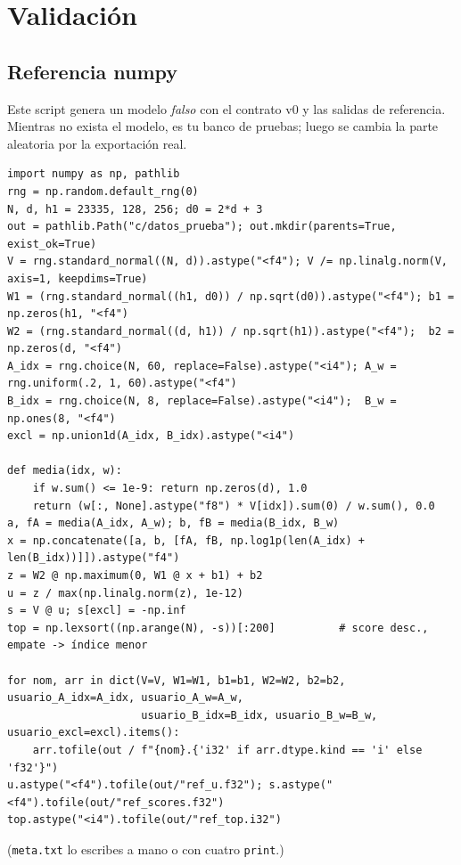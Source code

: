 \documentclass[a4paper,11pt]{article}
\newcommand{\cod}[1]{\texttt{#1}}
\begin{document}
\section{Validación}\label{sec:valid}

\subsection{Referencia numpy}
Este script genera un modelo \emph{falso} con el contrato v0 y las salidas de referencia. Mientras no exista el
modelo, es tu banco de pruebas; luego se cambia la parte aleatoria por la exportación real.
\begin{lstlisting}[style=py]
import numpy as np, pathlib
rng = np.random.default_rng(0)
N, d, h1 = 23335, 128, 256; d0 = 2*d + 3
out = pathlib.Path("c/datos_prueba"); out.mkdir(parents=True, exist_ok=True)
V = rng.standard_normal((N, d)).astype("<f4"); V /= np.linalg.norm(V, axis=1, keepdims=True)
W1 = (rng.standard_normal((h1, d0)) / np.sqrt(d0)).astype("<f4"); b1 = np.zeros(h1, "<f4")
W2 = (rng.standard_normal((d, h1)) / np.sqrt(h1)).astype("<f4");  b2 = np.zeros(d, "<f4")
A_idx = rng.choice(N, 60, replace=False).astype("<i4"); A_w = rng.uniform(.2, 1, 60).astype("<f4")
B_idx = rng.choice(N, 8, replace=False).astype("<i4");  B_w = np.ones(8, "<f4")
excl = np.union1d(A_idx, B_idx).astype("<i4")

def media(idx, w):
    if w.sum() <= 1e-9: return np.zeros(d), 1.0
    return (w[:, None].astype("f8") * V[idx]).sum(0) / w.sum(), 0.0
a, fA = media(A_idx, A_w); b, fB = media(B_idx, B_w)
x = np.concatenate([a, b, [fA, fB, np.log1p(len(A_idx) + len(B_idx))]]).astype("f4")
z = W2 @ np.maximum(0, W1 @ x + b1) + b2
u = z / max(np.linalg.norm(z), 1e-12)
s = V @ u; s[excl] = -np.inf
top = np.lexsort((np.arange(N), -s))[:200]          # score desc., empate -> índice menor

for nom, arr in dict(V=V, W1=W1, b1=b1, W2=W2, b2=b2, usuario_A_idx=A_idx, usuario_A_w=A_w,
                     usuario_B_idx=B_idx, usuario_B_w=B_w, usuario_excl=excl).items():
    arr.tofile(out / f"{nom}.{'i32' if arr.dtype.kind == 'i' else 'f32'}")
u.astype("<f4").tofile(out/"ref_u.f32"); s.astype("<f4").tofile(out/"ref_scores.f32")
top.astype("<i4").tofile(out/"ref_top.i32")
\end{lstlisting}
(\cod{meta.txt} lo escribes a mano o con cuatro \cod{print}.)
\end{document}
